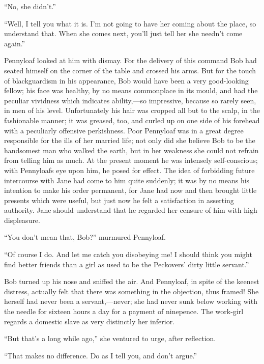 ``No, she didn't.''

``Well, I tell you what it is. I'm not going to have her coming about
the place, so understand that. When she comes next, you'll just tell her
she needn't come again.''

Pennyloaf looked at him with dismay. For the delivery of this command
Bob had seated himself on the corner of the table and crossed his arms.
But for the touch of blackguardism in his appearance, Bob would have
been a very good-looking fellow; his face was healthy, by no means
commonplace in its mould, and had the peculiar vividness which
{\protect\hypertarget{224}{}{}}indicates ability,---so impressive,
because so rarely seen, in men of his level. Unfortunately his hair was
cropped all but to the scalp, in the fashionable manner; it was greased,
too, and curled up on one side of his forehead with a peculiarly
offensive perkishness. Poor Pennyloaf was in a great degree responsible
for the ills of her married life; not only did she believe Bob to be the
handsomest man who walked the earth, but in her weakness she could not
refrain from telling him as much. At the present moment he was intensely
self-conscious; with Pennyloafs eye upon him, he posed for effect. The
idea of forbidding future intercourse with Jane had come to him quite
suddenly; it was by no means his intention to make his order permanent,
for Jane had now and then brought little presents which were useful, but
just now he felt a satisfaction in asserting authority. Jane should
understand that he regarded her censure of him with high displeasure.

``You don't mean that, Bob?'' murmured Pennyloaf.

{\protect\hypertarget{225}{}{}}``Of course I do. And let me catch you
disobeying me! I should think you might find better friends than a girl
as used to be the Peckovers' dirty little servant.''

Bob turned up his nose and sniffed the air. And Pennyloaf, in spite of
the keenest distress, actually felt that there was something in the
objection, thus framed! She herself had never been a servant,---never;
she had never sunk below working with the needle for sixteen hours a day
for a payment of ninepence. The work-girl regards a domestic slave as
very distinctly her inferior.

``But that's a long while ago,'' she ventured to urge, after reflection.

``That makes no difference. Do as I tell you, and don't argue.''

